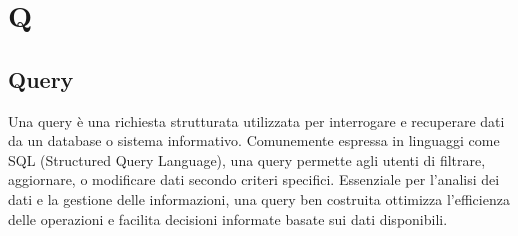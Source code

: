\section{Q}
\vspace{2em}
\subsection*{Query}
\par Una query è una richiesta strutturata utilizzata per interrogare e recuperare dati da un database o sistema informativo. Comunemente espressa in linguaggi come SQL (Structured Query Language), una query permette agli utenti di filtrare, aggiornare, o modificare dati secondo criteri specifici. Essenziale per l'analisi dei dati e la gestione delle informazioni, una query ben costruita ottimizza l'efficienza delle operazioni e facilita decisioni informate basate sui dati disponibili.
